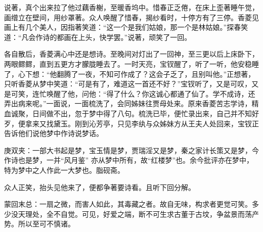 \begin{parag}
    说著，真个出来拉了他过藕香榭，至暖香坞中。惜春正乏倦，在床上歪著睡午觉，画缯立在壁间，用纱罩著。众人唤醒了惜春，揭纱看时，十停方有了三停。香菱见画上有几个美人，因指著笑道：“这一个是我们姑娘，那一个是林姑娘。”探春笑道：“凡会作诗的都画在上头，快学罢。”说著，顽笑了一回。
\end{parag}


\begin{parag}
    各自散后，香菱满心中还是想诗。至晚间对灯出了一回神，至三更以后上床卧下，两眼鳏鳏，直到五更方才朦胧睡去了。一时天亮，宝钗醒了，听了一听，他安稳睡了，心下想：“他翻腾了一夜，不知可作成了？这会子乏了，且别叫他。”正想著，只听香菱从梦中笑道：“可是有了，难道这一首还不好？”宝钗听了，又是可叹，又是可笑，连忙唤醒了他，问他：“得了什么？你这诚心都通了仙了。学不成诗，还弄出病来呢。”一面说，一面梳洗了，会同姊妹往贾母处来。原来香菱苦志学诗，精血诚聚，日间做不出，忽于梦中得了八句。梳洗已毕，便忙录出来，自己并不知好歹，便拿来又找黛玉。刚到沁芳亭，只见李纨与众姊妹方从王夫人处回来，宝钗正告诉他们说他梦中作诗说梦话。\begin{note}庚双夹：一部大书起是梦，宝玉情是梦，贾瑞淫又是梦，秦之家计长策又是梦，今作诗也是梦，一并“风月鉴” 亦从梦中所有，故“红楼梦”也。余今批评亦在梦中，特为梦中之人作此一大梦也。脂砚斋。\end{note}众人正笑，抬头见他来了，便都争著要诗看。且听下回分解。
\end{parag}


\begin{parag}
    \begin{note}蒙回末总：一扇之微，而害人如此，其毒藏之者。故自无味，构求者更觉可笑。多少没天理处，全不自觉。可见，好爱之端，断不可生求古董于古坟，争盆景而荡产势。所以至可不慎诸。\end{note}
\end{parag}

